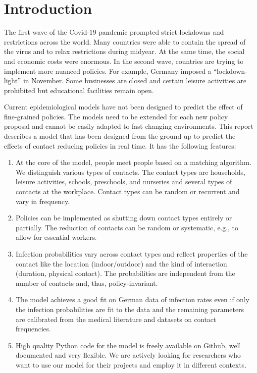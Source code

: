 \section{Introduction}
\label{sec:introduction}

The first wave of the Covid-19 pandemic prompted strict lockdowns and restrictions
across the world. Many countries were able to contain the spread of the virus and to
relax restrictions during midyear. At the same time, the social and economic costs were
enormous. In the second wave, countries are trying to implement more nuanced policies.
For example, Germany imposed a ``lockdown-light'' in November. Some businesses are
closed and certain leisure activities are prohibited but educational facilities remain
open.

Current epidemiological models have not been designed to predict the effect of
fine-grained policies. The models need to be extended for each new policy proposal and
cannot be easily adapted to fast changing environments. This report describes a model
that has been designed from the ground up to predict the effects of contact reducing
policies in real time. It has the following features:

\begin{enumerate}
    \item At the core of the model, people meet people based on a matching algorithm. We
          distinguish various types of contacts. The contact types are households,
          leisure activities, schools, preschools, and nurseries and several types of
          contacts at the workplace. Contact types can be random or recurrent and vary
          in frequency.

    \item Policies can be implemented as shutting down contact types entirely or
          partially. The reduction of contacts can be random or systematic, e.g., to
          allow for essential workers.

    \item Infection probabilities vary across contact types and reflect properties of
          the contact like the location (indoor/outdoor) and the kind of interaction
          (duration, physical contact). The probabilities are independent from the
          number of contacts and, thus, policy-invariant.

    \item The model achieves a good fit on German data of infection rates even if only
          the infection probabilities are fit to the data and the remaining parameters
          are calibrated from the medical literature and datasets on contact
          frequencies.

    \item High quality Python code for the model is freely available on Github, well
          documented and very flexible\footnotemark. We are actively looking for
          researchers who want to use our model for their projects and employ it in
          different contexts.
\end{enumerate}

